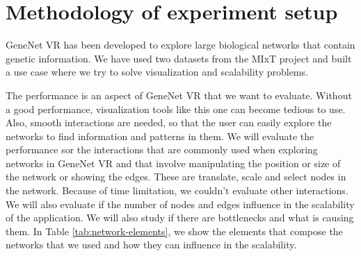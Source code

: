 \section{Methodology of experiment setup}

GeneNet VR has been developed to explore large biological networks that contain genetic information. We have used two datasets from the MIxT project \cite{dumeaux_fjukstad_interactions_tumor_blood} and built a use case where we try to solve visualization and scalability problems.

The performance is an aspect of GeneNet VR that we want to evaluate. Without a good performance, visualization tools like this one can become tedious to use. Also, smooth interactions are needed, so that the user can easily explore the networks to find information and patterns in them. We will evaluate the performance sor the interactions that are commonly used when exploring networks in GeneNet VR and that involve manipulating the position or size of the network or showing the edges. These are translate, scale and select nodes in the network. Because of time limitation, we couldn't evaluate other interactions. We will also evaluate if the number of nodes and edges influence in the scalability of the application. We will also study if there are bottlenecks and what is causing them. In Table \ref{tab:network-elements}, we show the elements that compose the networks that we used and how they can influence in the scalability.

